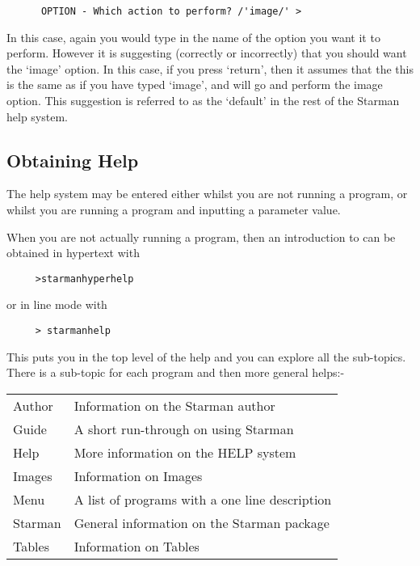 \begin{verbatim}
      OPTION - Which action to perform? /'image/' > \end{verbatim}

    In this case, again you would type in the name of the option you
    want it to perform. However it is suggesting (correctly or
    incorrectly) that you should want the `image' option. In this case,
    if you press `return', then it assumes that the this is the same as
    if you have typed `image', and will go and perform the image
    option. This suggestion is referred to as the `default' in the rest
    of the Starman help system.

\subsection{Obtaining Help}

The \starman help system may be entered either whilst you are not
running a program, or whilst you are running a program and inputting a
parameter value.

When you are not actually running a program, then an introduction to
\starman can be obtained in hypertext with

\begin{verbatim}
     >starmanhyperhelp \end{verbatim}

or in line mode with

\begin{verbatim}
     > starmanhelp \end{verbatim}

This puts you in the top level of the \starman help and you can explore
all the sub-topics. There is a sub-topic for each program and then more
general helps:-

\begin{tabular}[c]{ll} \hspace{4ex}  Author  & Information on the
Starman author \\ \hspace{4ex}  Guide   & A short run-through on using
Starman \\ \hspace{4ex}  Help    & More information on the HELP system
\\ \hspace{4ex}  Images  & Information on Images \\ \hspace{4ex}
Menu    & A list of programs with a one line description \\
\hspace{4ex}  Starman & General information on the Starman package \\
\hspace{4ex}  Tables  & Information on Tables \\ \end{tabular}

